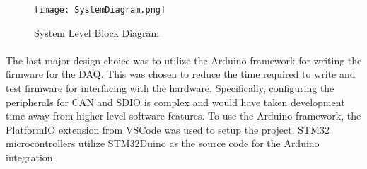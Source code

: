\begin{figure}[H]
	\centering
	\texttt{[image: SystemDiagram.png]}
	\caption{System Level Block Diagram}
	\label{fig:SysDiagram}
\end{figure}

\paragraph{}
The last major design choice was to utilize the Arduino framework for writing the firmware for the DAQ.
This was chosen to reduce the time required to write and test firmware for interfacing with the hardware.
Specifically, configuring the peripherals for CAN and SDIO is complex and would have taken development time away from higher level software features.
To use the Arduino framework, the PlatformIO \cite{PlatformIOSite} extension from VSCode \cite{VSCode} was used to setup the project.
STM32 microcontrollers utilize STM32Duino \cite{STM32DuinoGithub} as the source code for the Arduino integration.